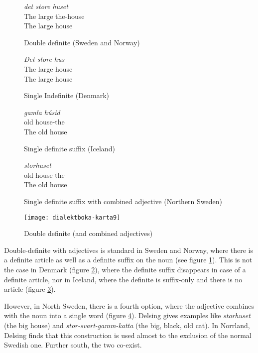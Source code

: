 \begin{figure}
  {\it det store huset} \\
  The large the-house \\
  The large house
  \caption{Double definite (Sweden and Norway)}
  \label{double-definite-example}
\end{figure}
\begin{figure}
  {\it Det store hus} \\
  The large house\\
  The large house
  \caption{Single Indefinite (Denmark)}
  \label{single-definite-example}
\end{figure}
\begin{figure}
  {\it gamla h\'usid} \\
  old house-the \\
  The old house
  \caption{Single definite suffix (Iceland)}
  \label{single-definite-suffix-example}
\end{figure}
\begin{figure}
  {\it storhuset} \\
  old-house-the \\
  The old house
  \caption{Single definite suffix with combined adjective (Northern Sweden)}
  \label{adjective-single-definite-suffix-example}
\end{figure}

\begin{figure}
  \texttt{[image: dialektboka-karta9]}
  \caption{Double definite (and combined adjectives)}
  \label{double-definite-map}
\end{figure}

Double-definite with adjectives is standard in Sweden and Norway,
where there is a definite article as well as a definite suffix on the
noun (see figure \ref{double-definite-example}). This is not the case
in Denmark (figure \ref{single-definite-example}), where the definite
suffix disappears in case of a definite article, nor in Iceland, where
the definite is suffix-only and there is no article (figure
\ref{single-definite-suffix-example}).

However, in North Sweden, there is a fourth option, where the
adjective combines with the noun into a single word (figure
\ref{adjective-single-definite-suffix-example}). Delsing gives
examples like {\it storhuset} (the big house) and {\it
  stor-svart-gamm-katta} (the big, black, old cat). In Norrland,
Delsing finds that this construction is used almost to the exclusion
of the normal Swedish one. Further south, the two co-exist.


